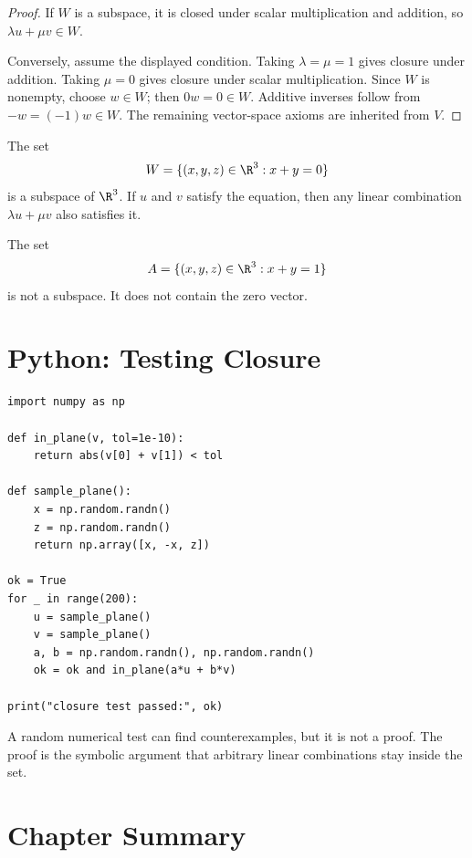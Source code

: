 \begin{proof}
  If $W$ is a subspace, it is closed under scalar multiplication and addition,
  so $\lambda u+\mu v\in W$.

  Conversely, assume the displayed condition. Taking $\lambda=\mu=1$ gives
  closure under addition. Taking $\mu=0$ gives closure under scalar
  multiplication. Since $W$ is nonempty, choose $w\in W$; then
  $0w=0\in W$. Additive inverses follow from $-w=(-1)w\in W$. The remaining
  vector-space axioms are inherited from $V$.
\end{proof}

\begin{example}
The set
\[
  W=\{(x,y,z)\in\R^3:x+y=0\}
\]
is a subspace of $\R^3$. If $u$ and $v$ satisfy the equation, then any linear
combination $\lambda u+\mu v$ also satisfies it.
\end{example}

\begin{example}
The set
\[
  A=\{(x,y,z)\in\R^3:x+y=1\}
\]
is not a subspace. It does not contain the zero vector.
\end{example}

\section{Python: Testing Closure}

\begin{lstlisting}
import numpy as np

def in_plane(v, tol=1e-10):
    return abs(v[0] + v[1]) < tol

def sample_plane():
    x = np.random.randn()
    z = np.random.randn()
    return np.array([x, -x, z])

ok = True
for _ in range(200):
    u = sample_plane()
    v = sample_plane()
    a, b = np.random.randn(), np.random.randn()
    ok = ok and in_plane(a*u + b*v)

print("closure test passed:", ok)
\end{lstlisting}

\begin{warningbox}
A random numerical test can find counterexamples, but it is not a proof. The
proof is the symbolic argument that arbitrary linear combinations stay inside
the set.
\end{warningbox}

\section*{Chapter Summary}

